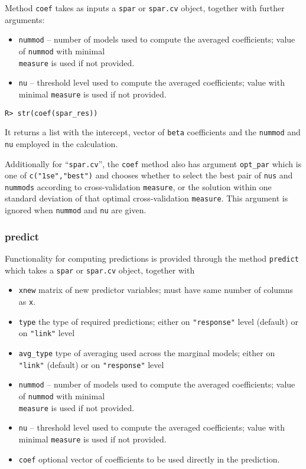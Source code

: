 \documentclass[
  article]{jss}
\begin{document}
Method \texttt{coef} takes as inputs a \texttt{spar} or \texttt{spar.cv}
object, together with further arguments:

\begin{itemize}
\item
  \texttt{nummod} -- number of models used to compute the averaged
  coefficients; value of \texttt{nummod} with minimal\\
  \texttt{measure} is used if not provided.
\item
  \texttt{nu} -- threshold level used to compute the averaged
  coefficients; value with minimal \texttt{measure} is used if not
  provided.
\end{itemize}

\begin{verbatim}
R> str(coef(spar_res))
\end{verbatim}

It returns a list with the intercept, vector of \texttt{beta}
coefficients and the \texttt{nummod} and \texttt{nu} employed in the
calculation.

Additionally for ``\texttt{spar.cv}'', the \texttt{coef} method also has
argument \texttt{opt\_par} which is one of \texttt{c("1se","best")} and
chooses whether to select the best pair of \texttt{nus} and
\texttt{nummods} according to cross-validation \texttt{measure}, or the
solution within one standard deviation of that optimal cross-validation
\texttt{measure}. This argument is ignored when \texttt{nummod} and
\texttt{nu} are given.

\subsubsection{predict}\label{predict}

Functionality for computing predictions is provided through the method
\texttt{predict} which takes a \texttt{spar} or \texttt{spar.cv} object,
together with

\begin{itemize}
\item
  \texttt{xnew} matrix of new predictor variables; must have same number
  of columns as \texttt{x}.
\item
  \texttt{type} the type of required predictions; either on
  \texttt{"response"} level (default) or on \texttt{"link"} level
\item
  \texttt{avg\_type} type of averaging used across the marginal models;
  either on \texttt{"link"} (default) or on \texttt{"response"} level
\item
  \texttt{nummod} -- number of models used to compute the averaged
  coefficients; value of \texttt{nummod} with minimal\\
  \texttt{measure} is used if not provided.
\item
  \texttt{nu} -- threshold level used to compute the averaged
  coefficients; value with minimal \texttt{measure} is used if not
  provided.
\item
  \texttt{coef} optional vector of coefficients to be used directly in
  the prediction.
\end{itemize}
\end{document}
